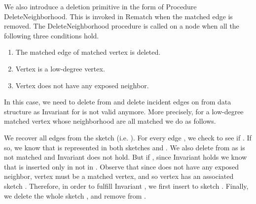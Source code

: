 \documentclass[11pt,letter]{article}
\begin{document}
\begin{center}
\end{center}





We also introduce a deletion primitive in the form of Procedure {\sf
  DeleteNeighborhood}.  This is
invoked in {\sf Rematch} when
the matched edge  is removed. 
The {\sf DeleteNeighborhood} procedure is called on a node  when 
all the following three conditions hold.
\begin{enumerate}
 \item The matched edge of matched vertex  is deleted.
 \item Vertex  is a low-degree vertex.
 \item Vertex   does not have any exposed neighbor.
\end{enumerate}

In this case, we need to delete  from  and delete incident edges on
 from data structure  as Invariant  for  is not valid
anymore. More precisely, for a low-degree matched vertex whose neighborhood
are all matched we do as follows.

We recover all edges from the sketch  (i.e. ).
For every edge ,
we check to see if .
If so, we know that 
is represented in both sketches  and .
We also delete  from  as  is not
matched and Invariant  does not hold.
But if ,
since Invariant  holds we know that  is inserted only in  not in .
Observe that since  does not have
any exposed neighbor, vertex  must be a matched vertex, and so
vertex  has an associated sketch .
Therefore, in order to fulfill Invariant , we first insert  to sketch .
Finally, we delete the whole sketch ,
and remove  from .
\end{document}
